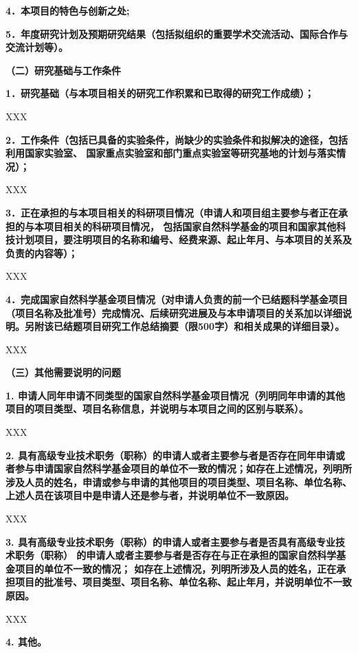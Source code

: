 \documentclass[a4paper,12pt]{article}
\newcommand{\NSFCblue}[1]{{\color{NSFCblue} #1}}
\newcommand{\NSFCnote}[1]{\textbf{\NSFCblue{#1}}}
\begin{document}
\NSFCnote{4．本项目的特色与创新之处;}

\vspace{1em}

\NSFCnote{5．年度研究计划及预期研究结果（包括拟组织的重要学术交流活动、国际合作与交流计划等）。}

\vspace{1em}
\NSFCnote{（二）研究基础与工作条件}

\NSFCnote{1．研究基础（与本项目相关的研究工作积累和已取得的研究工作成绩）；}

XXX


\NSFCnote{2．工作条件（包括已具备的实验条件，尚缺少的实验条件和拟解决的途径，包括利用国家实验室、
国家重点实验室和部门重点实验室等研究基地的计划与落实情况）；}

XXX


\NSFCnote{3．正在承担的与本项目相关的科研项目情况（申请人和项目组主要参与者正在承担的与本项目相关的科研项目情况，
包括国家自然科学基金的项目和国家其他科技计划项目，要注明项目的名称和编号、经费来源、起止年月、与本项目的关系及负责的内容等）；}

XXX


\NSFCnote{4．完成国家自然科学基金项目情况（对申请人负责的前一个已结题科学基金项目（项目名称及批准号）完成情况、后续研究进展及与本申请项目的关系加以详细说明。另附该已结题项目研究工作总结摘要（限500字）和相关成果的详细目录）。}

XXX

\NSFCnote{（三）其他需要说明的问题}

\NSFCnote{1. 申请人同年申请不同类型的国家自然科学基金项目情况（列明同年申请的其他项目的项目类型、项目名称信息，并说明与本项目之间的区别与联系）。} 

XXX

\NSFCnote{2. 具有高级专业技术职务（职称）的申请人或者主要参与者是否存在同年申请或者参与申请国家自然科学基金项目的单位不一致的情况；如存在上述情况，列明所涉及人员的姓名，申请或参与申请的其他项目的项目类型、项目名称、单位名称、上述人员在该项目中是申请人还是参与者，并说明单位不一致原因。}

XXX 

\NSFCnote{3. 具有高级专业技术职务（职称）的申请人或者主要参与者是否具有高级专业技术职务（职称）
的申请人或者主要参与者是否存在与正在承担的国家自然科学基金项目的单位不一致的情况；
如存在上述情况，列明所涉及人员的姓名，正在承担项目的批准号、项目类型、项目名称、单位名称、起止年月，并说明单位不一致原因。}

XXX

\NSFCnote{4. 其他。}
\end{document}

